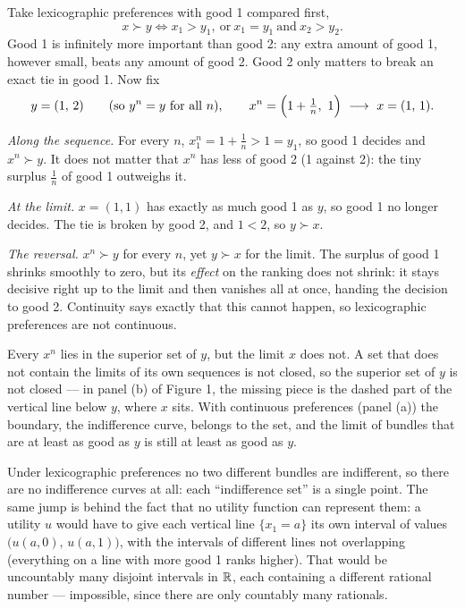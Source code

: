 \documentclass[11pt]{article}
\begin{document}
Take lexicographic preferences with good 1 compared first,
\[ x\succ y \iff x_1>y_1,\ \text{or}\ x_1=y_1\ \text{and}\ x_2>y_2 . \]
Good 1 is infinitely more important than good 2: any extra amount of good 1, however
small, beats any amount of good 2. Good 2 only matters to break an exact tie in good
1. Now fix
\[ y=(1,\,2)\qquad(\text{so } y^{n}=y \text{ for all } n), \qquad
   x^{n}=\Bigl(1+\tfrac1n,\ 1\Bigr)\ \longrightarrow\ x=(1,\,1). \]
\begin{flatnum}
  \item \emph{Along the sequence.} For every $n$, $x^{n}_1=1+\frac1n>1=y_1$, so good 1
        decides and $x^{n}\succ y$. It does not matter that $x^{n}$ has less of good
        2 (1 against 2): the tiny surplus $\frac1n$ of good 1 outweighs it.
  \item \emph{At the limit.} $x=(1,1)$ has exactly as much good 1 as $y$, so good 1
        no longer decides. The tie is broken by good 2, and $1<2$, so $y\succ x$.
  \item \emph{The reversal.} $x^{n}\succ y$ for every $n$, yet $y\succ x$ for the
        limit. The surplus of good 1 shrinks smoothly to zero, but its
        \emph{effect} on the ranking does not shrink: it stays decisive right up to
        the limit and then vanishes all at once, handing the decision to good 2.
        Continuity says exactly that this cannot happen, so lexicographic
        preferences are not continuous.
\end{flatnum}

 Every $x^{n}$ lies in the superior
set of $y$, but the limit $x$ does not. A set that does not contain
the limits of its own sequences is not closed, so the superior set of $y$ is not
closed --- in panel (b) of Figure 1, the missing piece is the dashed part of
the vertical line below $y$, where $x$ sits. With continuous preferences (panel
(a)) the boundary, the indifference curve, belongs to the set, and the limit of
bundles that are at least as good as $y$ is still at least as good as $y$.

 Under lexicographic preferences no two
different bundles are indifferent, so there are no indifference curves at all: each
``indifference set'' is a single point. The same jump is behind the fact that no
utility function can represent them: a utility $u$ would have to give each vertical
line $\{x_1=a\}$ its own interval of values $\bigl(u(a,0),\,u(a,1)\bigr)$, with
the intervals of different lines not overlapping (everything on a line with more
good 1 ranks higher). That would be uncountably many disjoint intervals in $\mathbb{R}$,
each containing a different rational number --- impossible, since there are only
countably many rationals.
\end{document}
